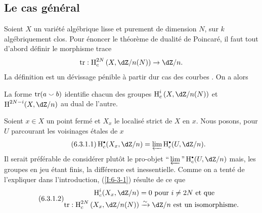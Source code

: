 









\subsection{Le cas général}\label{I:6-3}

Soient $X$ un variété algébrique lisse et purement de dimension $N$, sur 
$k$ algébriquement clos. Pour énoncer le théorème de dualité de 
Poincaré, il faut tout d'abord définir le morphisme trace 
\[
  \tr : \h_c^{2N}\left(X,\dZ/n(N)\right) \to \dZ/n\text{.}
\]
La définition est un dévissage pénible à partir dur cas des courbes 
\cite[XVIII \S 2]{sga4}. On a alors 





\begin{theorem}\label{I:6-3-1}
La forme $\operatorname{tr}(a\smallsmile b)$ identifie chacun des groupes 
$\h_c^i\left(X,\dZ/n(N)\right)$ et $\h^{2 N-i}(X,\dZ/n)$ au dual de l'autre.
\end{theorem}

Soient $x\in X$ un point fermé et $X_x$ le localisé strict de $X$ en $x$. 
Nous posons, pour $U$ parcourant les voisinages étales de $x$ 
\begin{equation*}\tag{6.3.1.1}\label{I:eq:6-3-1-1}
  \h_c^\bullet(X_x,\dZ/n) = \varprojlim \h_c^\bullet(U,\dZ/n) \text{.}
\end{equation*}
Il serait préférable de considérer plutôt le pro-objet 
$\text{``}\varprojlim\text{''} \h_c^\bullet(U,\dZ/n)$ mais, les groupes en jeu 
étant finis, la différence est inessentielle. Comme on a tenté de 
l'expliquer dans l'introduction, (\ref{I:6-3-1}) résulte de ce que 
\begin{equation*}\tag{6.3.1.2}\label{I:eq:6-3-1-2}
\begin{aligned}
  \h_c^i(X_x,\dZ/n) &= 0 \text{ pour $i\ne 2N$ et que } \\
  \tr : \h_c^{2 N}\left(X_x,  \dZ/n(N)\right) &\iso \dZ/n \text{ est un isomorphisme.} 
\end{aligned}
\end{equation*}

